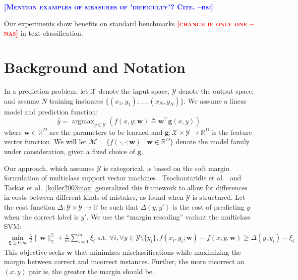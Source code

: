 \documentclass{article} %
\DeclareMathOperator*{\argmax}{argmax}
\newcommand{\bmcomment}[1]{\textcolor{blue}{\textsc{\textbf{[#1 --bm]}}}}
\newcommand{\nascomment}[1]{\textcolor{red}{\textsc{\textbf{[#1 --nas]}}}}
\begin{document}
\bmcomment{Mention examples of measures of 'difficulty'? Cite.}



Our experiments show benefits on standard benchmarks
\nascomment{change if only one} in text classification.


\section{Background and Notation}

In a prediction problem, let $\mathcal{X}$ denote the input space,
$\mathcal{Y}$ denote the output space, and assume $N$ training
instances $\{(x_1, y_1), \ldots, (x_N, y_N)\}$.  We assume a linear
model and prediction function:
\begin{equation}
\hat{y} = \argmax_{y \in \mathcal{Y}} \left(f(x, y;\mathbf{w}) \triangleq \mathbf{w}^\top \mathbf{g}(x, y) \right)
\end{equation}
where $\mathbf{w} \in \mathbb{R}^D$ are the parameters to be learned
and $\mathbf{g} : \mathcal{X} \times \mathcal{Y} \rightarrow
\mathbb{R}^D$ is the feature vector function.  We will let
$\mathcal{M} =\{f(\cdot,\cdot;\mathbf{w}) \mid \mathbf{w} \in
\mathbb{R}^D\}$ denote the model family under consideration, given a
fixed choice of $\mathbf{g}$.

Our approach, which assumes $\mathcal{Y}$ is categorical, is based on
the soft margin formulation of multiclass support vector machines
\citep{vapnik1998statistical,crammer2002algorithmic,weston1998multi}.
Tsochantaridis et al.~\citep{tsochantaridis2004support} and Taskar et
al.~\ref{koller2003max} generalized this framework to allow for
differences in costs between different kinds of mistakes, as found
when $\mathcal{Y}$ is structured.  Let the cost function
$\Delta:\mathcal{Y}\times\mathcal{Y}\rightarrow\mathbb{R}$  be such
that $\Delta(y, y')$ is the cost of predicting $y$ when the correct
label is $y'$.  We use the ``margin rescaling'' variant the multiclass SVM:
\begin{align}
 \min_{\boldsymbol{\xi}\geq 0, \mathbf{w}}
\frac{\lambda}{2}\|\mathbf{w}\|_2^2+\frac{1}{m}\sum_{i=1}^m\xi_i 
 \text{\ \ \ s.t.\ \ \ } \forall i,  \forall y \in \mathcal{Y} \setminus
 \{y_i\},  f(x_i, y_i; \mathbf{w}) - f(x, y, \mathbf{w}) \geq
 \Delta(y, y_i) - \xi_i \label{marginRescaling}
\end{align}
This objective seeks $\mathbf{w}$ that minimizes misclassifications while
maximizing the margin between correct and incorrect instances.
Further, the more incorrect an $(x,y)$ pair is, the greater the margin
should be.
\end{document}
